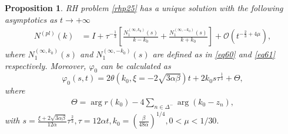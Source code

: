 \documentclass[11pt]{article}
\numberwithin{equation}{section}
\newtheorem{Proposition}{Proposition}
\begin{document}
\begin{Proposition}\label{p26}
    RH problem \ref{rhp25} has a unique solution with the following asymptotics as $t\to +\infty$
    \begin{align}
        N^{(pl)}(k)
        &=I+\tau^{-\frac{1}{3}}\left[\frac{N^{(\infty,k_0)}_1(s)}{k-k_0}+\frac{N^{(\infty,-k_0)}_1(s)}{k+k_0}\right]+\mathcal{O}(t^{-\frac{2}{3}+4\mu}),\label{eq64}
    \end{align}
    where $N^{(\infty,k_0)}_1(s)$ and $N^{(\infty,-k_0)}_1(s)$ are defined as in \eqref{eq60} and \eqref{eq61} respectively. Moreover, $\varphi_0$ can be calculated as
    \begin{equation}
\varphi_0(s,t)=2\theta(k_0,\xi=-2\sqrt{3\alpha\beta})t+2k_0s\tau^{\frac{1}{3}}+\Theta,
    \end{equation}
where
\begin{align}
    \Theta=\arg r(k_0)-4\sum_{n\in\Delta^-}\arg(k_0-z_n),
\end{align}
    with $s=\frac{\xi+2\sqrt{3\alpha \beta}}{12\alpha}\tau ^{\frac{2}{3}},\tau=12\alpha t,k_0=\left(\frac{\beta}{48\alpha}\right)^{1/4},0<\mu<1/30.$
\end{Proposition}
\end{document}
